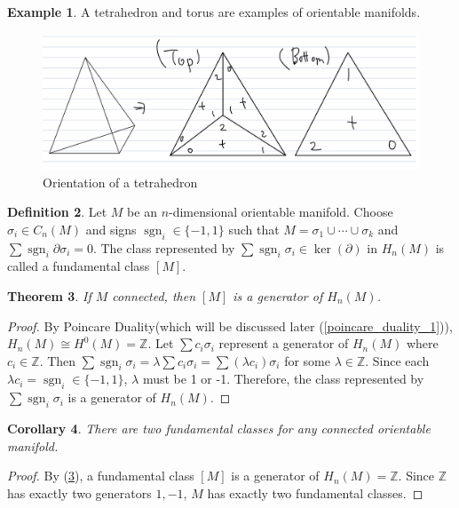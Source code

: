 \documentclass[psamsfonts]{amsart}
\newtheorem{thm}{Theorem}[section]
\newtheorem{cor}[thm]{Corollary}
\theoremstyle{definition}
\newtheorem{defn}[thm]{Definition}
\newtheorem{exmp}[thm]{Example}
\theoremstyle{remar}
\DeclareMathOperator{\sgn}{sgn}
\numberwithin{equation}{section}
\begin{document}
\begin{exmp}
  A tetrahedron and torus are examples of orientable manifolds.
  \begin{figure}[!htb]
    \includegraphics[width=.5\linewidth]{img/orientation_tetrahedron.jpeg}
    \caption{Orientation of a tetrahedron}
    \label{fig:orientation_tetrahedron}
  \end{figure}
\end{exmp}

\begin{defn}
  Let $M$ be an $n$-dimensional orientable manifold.
  Choose $\sigma_i \in C_n(M)$ and signs $\sgn_i \in \{ -1, 1 \}$ such that $M = \sigma_1 \cup \cdots \cup \sigma_k$ and $\sum \sgn_i \partial \sigma_i = 0$.
  The class represented by $\sum \sgn_i \sigma_i \in \ker(\partial)$ in $H_n(M)$ is called a fundamental class $[M]$.
\end{defn}

\begin{thm}\label{fundamental_class_generator}
  If $M$ connected, then $[M]$ is a generator of $H_n(M)$.
\end{thm}

\begin{proof}
  By Poincare Duality(which will be discussed later (\ref{poincare_duality_1})), $H_n(M) \cong H^0(M) = \mathbb{Z}$.
  Let $\sum c_i \sigma_i$ represent a generator of $H_n(M)$ where $c_i \in \mathbb{Z}$.
  Then $\sum \sgn_i \sigma_i = \lambda\sum c_i \sigma_i = \sum (\lambda c_i) \sigma_i$ for some $\lambda \in \mathbb{Z}$.
  Since each $\lambda c_i = \sgn_i \in \{ -1, 1 \}$, $\lambda$ must be 1 or -1.
  Therefore, the class represented by $\sum \sgn_i \sigma_i$ is a generator of $H_n(M)$.
\end{proof}

\begin{cor}
  There are two fundamental classes for any connected orientable manifold.
\end{cor}

\begin{proof}
  By (\ref{fundamental_class_generator}), a fundamental class $[M]$ is a generator of $H_n(M) = \mathbb{Z}$.
  Since $\mathbb{Z}$ has exactly two generators $1, -1$, $M$ has exactly two fundamental classes.
\end{proof}
\end{document}
